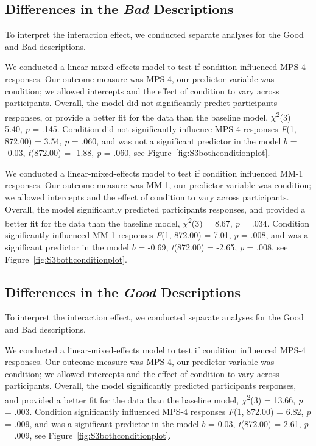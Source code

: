 \documentclass[
  english,
  man,floatsintext]{apa7}
\begin{document}
\hypertarget{differences-in-the-bad-descriptions}{%
\subsection{\texorpdfstring{Differences in the \emph{Bad} Descriptions}{Differences in the Bad Descriptions}}\label{differences-in-the-bad-descriptions}}

To interpret the interaction effect, we conducted separate analyses for the Good and Bad descriptions.

We conducted a linear-mixed-effects model to test if condition influenced MPS-4 responses. Our outcome measure was MPS-4, our predictor variable was condition; we allowed intercepts and the effect of condition to vary across participants. Overall, the model did not significantly predict participants responses, or provide a better fit for the data than the baseline model, \(\chi\)\textsuperscript{2}(3) = 5.40, \emph{p} = .145. Condition did not significantly influence MPS-4 responses \emph{F}(1, 872.00) = 3.54, \emph{p} = .060, and was not a significant predictor in the model \(b\) = -0.03, \emph{t}(872.00) = -1.88, \emph{p} = .060, see Figure~\ref{fig:S3bothconditionplot}.

We conducted a linear-mixed-effects model to test if condition influenced MM-1 responses. Our outcome measure was MM-1, our predictor variable was condition; we allowed intercepts and the effect of condition to vary across participants. Overall, the model significantly predicted participants responses, and provided a better fit for the data than the baseline model, \(\chi\)\textsuperscript{2}(3) = 8.67, \emph{p} = .034. Condition significantly influenced MM-1 responses \emph{F}(1, 872.00) = 7.01, \emph{p} = .008, and was a significant predictor in the model \(b\) = -0.69, \emph{t}(872.00) = -2.65, \emph{p} = .008, see Figure~\ref{fig:S3bothconditionplot}.

\hypertarget{differences-in-the-good-descriptions}{%
\subsection{\texorpdfstring{Differences in the \emph{Good} Descriptions}{Differences in the Good Descriptions}}\label{differences-in-the-good-descriptions}}

To interpret the interaction effect, we conducted separate analyses for the Good and Bad descriptions.

We conducted a linear-mixed-effects model to test if condition influenced MPS-4 responses. Our outcome measure was MPS-4, our predictor variable was condition; we allowed intercepts and the effect of condition to vary across participants. Overall, the model significantly predicted participants responses, and provided a better fit for the data than the baseline model, \(\chi\)\textsuperscript{2}(3) = 13.66, \emph{p} = .003. Condition significantly influenced MPS-4 responses \emph{F}(1, 872.00) = 6.82, \emph{p} = .009, and was a significant predictor in the model \(b\) = 0.03, \emph{t}(872.00) = 2.61, \emph{p} = .009, see Figure~\ref{fig:S3bothconditionplot}.
\end{document}
